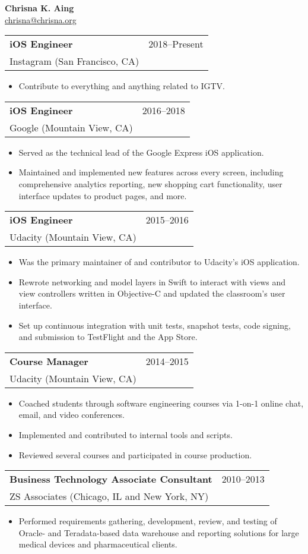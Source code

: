 \documentclass[letterpaper, 12pt]{article}
\makeatletter
\newcommand{\resumeheading}[1]
{\fcolorbox{black}{lightgray}{\begin{minipage}{6.4in}
    \textbf{\large #1 \vphantom{p\^{E}}}\end{minipage}}\vspace{6pt}
}
\newcommand{\worksubsection}[4]
{\begin{tabular*}{\linewidth}{@{\extracolsep{\fill}} l r}
    \textbf{#1} & #2\\
    #3 (#4)\\
\end{tabular*}}
\newenvironment{resumeitemize}
{\begin{itemize}
    \vspace{-3pt}
    \setlength{\itemsep}{2pt}
    \setlength{\parskip}{0pt}
    \setlength{\parsep}{0pt}}
{\end{itemize}}
\makeatother
\begin{document}
\begin{center}
    \textbf{\large Chrisna K. Aing}\\
    \href{mailto:chrisna@chrisna.org}{chrisna@chrisna.org}
\end{center}

\resumeheading{Work Experience}
    \worksubsection
        {iOS Engineer}
        {2018--Present}
        {Instagram}
        {San Francisco, CA}
    \begin{resumeitemize}
        \item{Contribute to everything and anything related to IGTV.}
    \end{resumeitemize}
    \worksubsection
        {iOS Engineer}
        {2016--2018}
        {Google}
        {Mountain View, CA}
    \begin{resumeitemize}
        \item{Served as the technical lead of the Google Express iOS
            application.}
        \item{Maintained and implemented new features across every screen,
            including comprehensive analytics reporting, new shopping cart
            functionality, user interface updates to product pages, and more.}
    \end{resumeitemize}
    \worksubsection
        {iOS Engineer}
        {2015--2016}
        {Udacity}
        {Mountain View, CA}
    \begin{resumeitemize}
        \item{Was the primary maintainer of and contributor to Udacity's iOS
            application.}
        \item{Rewrote networking and model layers in Swift to interact with
            views and view controllers written in Objective-C and updated the
            classroom's user interface.}
        \item{Set up continuous integration with unit tests, snapshot tests,
            code signing, and submission to TestFlight and the App Store.}
    \end{resumeitemize}
    \worksubsection
        {Course Manager}
        {2014--2015}
        {Udacity}
        {Mountain View, CA}
    \begin{resumeitemize}
        \item{Coached students through software engineering courses via 1-on-1
            online chat, email, and video conferences.}
        \item{Implemented and contributed to internal tools and scripts.}
        \item{Reviewed several courses and participated in course production.}
    \end{resumeitemize}
    \worksubsection
        {Business Technology Associate Consultant}
        {2010--2013}
        {ZS Associates}
        {Chicago, IL and New York, NY}
    \begin{resumeitemize}
        \item{Performed requirements gathering, development, review, and
            testing of Oracle- and Teradata-based data warehouse and reporting
            solutions for large medical devices and pharmaceutical clients.}
    \end{resumeitemize}
\end{document}
